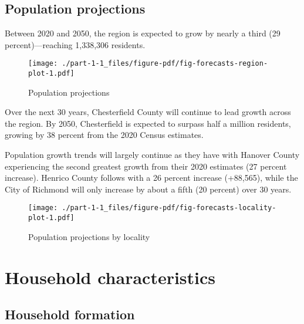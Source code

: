\documentclass[
  letterpaper,
  DIV=11,
  numbers=noendperiod]{scrreprt}
\begin{document}
\hypertarget{population-projections}{%
\section{Population projections}\label{population-projections}}

Between 2020 and 2050, the region is expected to grow by nearly a third
(29 percent)---reaching 1,338,306 residents.

\begin{figure}

{\centering \texttt{[image: ./part-1-1\_files/figure-pdf/fig-forecasts-region-plot-1.pdf]}

}

\caption{\label{fig-forecasts-region-plot}Population projections}

\end{figure}

Over the next 30 years, Chesterfield County will continue to lead growth
across the region. By 2050, Chesterfield is expected to surpass half a
million residents, growing by 38 percent from the 2020 Census estimates.

Population growth trends will largely continue as they have with Hanover
County experiencing the second greatest growth from their 2020 estimates
(27 percent increase). Henrico County follows with a 26 percent increase
(+88,565), while the City of Richmond will only increase by about a
fifth (20 percent) over 30 years.

\begin{figure}

{\centering \texttt{[image: ./part-1-1\_files/figure-pdf/fig-forecasts-locality-plot-1.pdf]}

}

\caption{\label{fig-forecasts-locality-plot}Population projections by
locality}

\end{figure}

\hypertarget{part-1-2}{%
\chapter{Household characteristics}\label{part-1-2}}

\hypertarget{household-formation}{%
\section{Household formation}\label{household-formation}}
\end{document}
